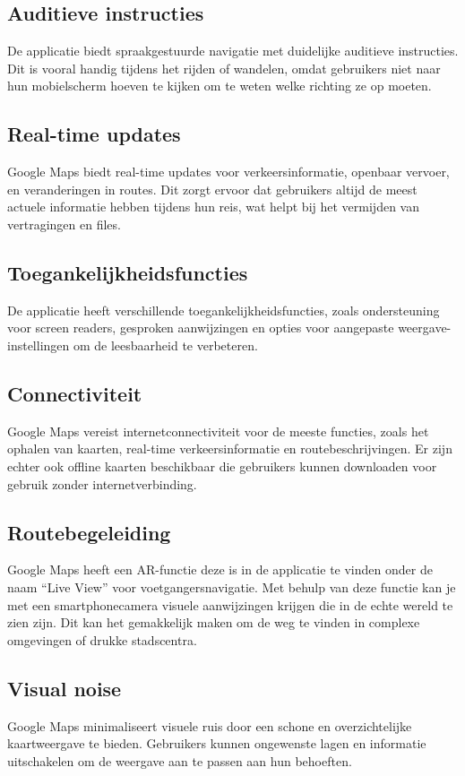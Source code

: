 \subsection*{Auditieve instructies}
De applicatie biedt spraakgestuurde navigatie met duidelijke auditieve instructies. Dit is vooral handig tijdens het rijden of wandelen, omdat gebruikers niet naar hun mobielscherm hoeven te kijken om te weten welke richting ze op moeten.

\subsection*{Real-time updates}
Google Maps biedt real-time updates voor verkeersinformatie, openbaar vervoer, en veranderingen in routes. Dit zorgt ervoor dat gebruikers altijd de meest actuele informatie hebben tijdens hun reis, wat helpt bij het vermijden van vertragingen en files.

\subsection*{Toegankelijkheidsfuncties}
De applicatie heeft verschillende toegankelijkheidsfuncties, zoals ondersteuning voor screen readers, gesproken aanwijzingen en opties voor aangepaste weergave-instellingen om de leesbaarheid te verbeteren.

\subsection*{Connectiviteit}
Google Maps vereist internetconnectiviteit voor de meeste functies, zoals het ophalen van kaarten, real-time verkeersinformatie en routebeschrijvingen. Er zijn echter ook offline kaarten beschikbaar die gebruikers kunnen downloaden voor gebruik zonder internetverbinding.

\subsection*{Routebegeleiding}
Google Maps heeft een AR-functie deze is in de applicatie te vinden onder de naam ``Live View'' voor voetgangersnavigatie. Met behulp van deze functie kan je met een smartphonecamera visuele aanwijzingen krijgen die in de echte wereld te zien zijn. Dit kan het gemakkelijk maken om de weg te vinden in complexe omgevingen of drukke stadscentra.

\subsection*{Visual noise}
Google Maps minimaliseert visuele ruis door een schone en overzichtelijke kaartweergave te bieden. Gebruikers kunnen ongewenste lagen en informatie uitschakelen om de weergave aan te passen aan hun behoeften.

